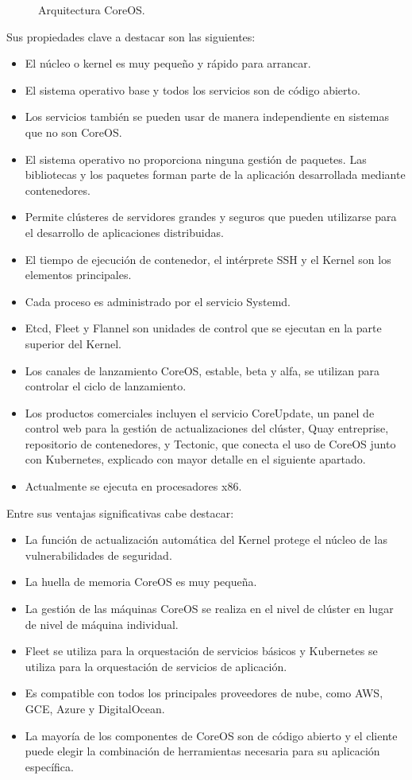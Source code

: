 \begin{figure}[H]
\caption{Arquitectura CoreOS.\label{fig:figure_placement_example}}
\end{figure}

Sus propiedades clave a destacar son las siguientes:

\begin{itemize}
\item El núcleo o kernel es muy pequeño y rápido para arrancar.
\item El sistema operativo base y todos los servicios son de código abierto.
\item Los servicios también se pueden usar de manera independiente en sistemas que no son CoreOS.
\item El sistema operativo no proporciona ninguna gestión de paquetes. Las bibliotecas y los paquetes forman parte de la aplicación desarrollada mediante contenedores.
\item Permite clústeres de servidores grandes y seguros que pueden utilizarse para el desarrollo de aplicaciones distribuidas.
\item El tiempo de ejecución de contenedor, el intérprete SSH y el Kernel son los elementos principales.
\item Cada proceso es administrado por el servicio Systemd.
\item Etcd, Fleet y Flannel son unidades de control que se ejecutan en la parte superior del Kernel.
\item Los canales de lanzamiento CoreOS, estable, beta y alfa, se utilizan para controlar el ciclo de lanzamiento.
\item Los productos comerciales incluyen el servicio CoreUpdate, un panel de control web para la gestión de actualizaciones del clúster, Quay entreprise, repositorio de contenedores, y Tectonic, que conecta el uso de CoreOS junto con Kubernetes, explicado con mayor detalle en el siguiente apartado.
\item Actualmente se ejecuta en procesadores x86.
\end{itemize}

Entre sus ventajas significativas cabe destacar:

\begin{itemize}
\item La función de actualización automática del Kernel protege el núcleo de las vulnerabilidades de seguridad.
\item La huella de memoria CoreOS es muy pequeña.
\item La gestión de las máquinas CoreOS se realiza en el nivel de clúster en lugar de nivel de máquina individual.
\item Fleet se utiliza para la orquestación de servicios básicos y Kubernetes se utiliza para la orquestación de servicios de aplicación.
\item Es compatible con todos los principales proveedores de nube, como AWS, GCE, Azure y DigitalOcean.
\item La mayoría de los componentes de CoreOS son de código abierto y el cliente puede elegir la combinación de herramientas necesaria para su aplicación específica.
\end{itemize}

